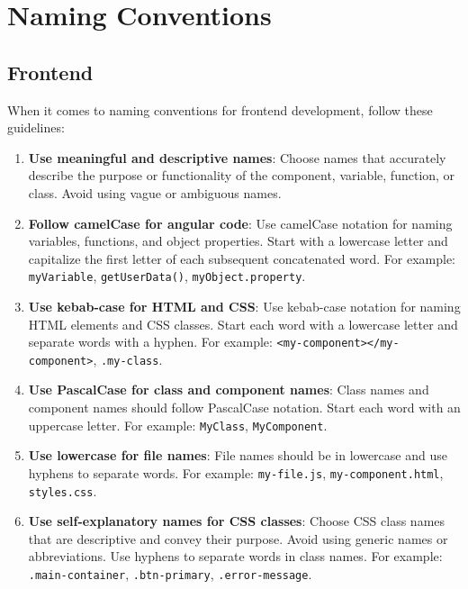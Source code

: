 \documentclass[12pt]{article}
\begin{document}
\newpage
\section{Naming Conventions}
\subsection{Frontend}

When it comes to naming conventions for frontend development, follow these guidelines:

\begin{enumerate}
    \item \textbf{Use meaningful and descriptive names}: Choose names that accurately describe the purpose or functionality of the component, variable, function, or class. Avoid using vague or ambiguous names.
    
    \item \textbf{Follow camelCase for angular code}: Use camelCase notation for naming variables, functions, and object properties. Start with a lowercase letter and capitalize the first letter of each subsequent concatenated word. For example: \texttt{myVariable}, \texttt{getUserData()}, \texttt{myObject.property}.
    
    \item \textbf{Use kebab-case for HTML and CSS}: Use kebab-case notation for naming HTML elements and CSS classes. Start each word with a lowercase letter and separate words with a hyphen. For example: \texttt{<my-component></my-component>}, \texttt{.my-class}.

    \item \textbf{Use PascalCase for class and component names}: Class names and component names should follow PascalCase notation. Start each word with an uppercase letter. For example: \texttt{MyClass}, \texttt{MyComponent}.
        
    \item \textbf{Use lowercase for file names}: File names should be in lowercase and use hyphens to separate words. For example: \texttt{my-file.js}, \texttt{my-component.html}, \texttt{styles.css}.
            
    \item \textbf{Use self-explanatory names for CSS classes}: Choose CSS class names that are descriptive and convey their purpose. Avoid using generic names or abbreviations. Use hyphens to separate words in class names. For example: \texttt{.main-container}, \texttt{.btn-primary}, \texttt{.error-message}.
    

\end{enumerate}
\end{document}
